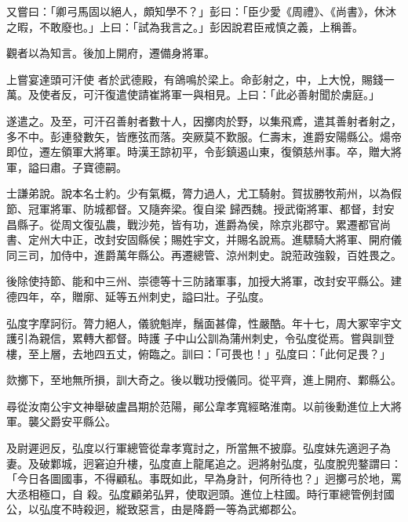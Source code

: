 \begin{pinyinscope}
 又嘗曰：「卿弓馬固以絕人，頗知學不？」彭曰：「臣少愛《周禮》、《尚書》，休沐之暇，不敢廢也。」上曰：「試為我言之。」彭因說君臣戒慎之義，上稱善。



 觀者以為知言。後加上開府，遷備身將軍。



 上嘗宴達頭可汗使
 者於武德殿，有鴿鳴於梁上。命彭射之，中，上大悅，賜錢一萬。及使者反，可汗復遣使請崔將軍一與相見。上曰：「此必善射聞於虜庭。」



 遂遣之。及至，可汗召善射者數十人，因擲肉於野，以集飛鳶，遣其善射者射之，多不中。彭連發數矢，皆應弦而落。突厥莫不歎服。仁壽末，進爵安陽縣公。煬帝即位，遷左領軍大將軍。時漢王諒初平，令彭鎮遏山東，復領慈州事。卒，贈大將軍，謚曰肅。子寶德嗣。



 士謙弟說。說本名士約。少有氣概，膂力過人，尤工騎射。賀拔勝牧荊州，以為假節、冠軍將軍、防城都督。又隨奔梁。復自梁
 歸西魏。授武衛將軍、都督，封安昌縣子。從周文復弘農，戰沙苑，皆有功，進爵為侯，除京兆郡守。累遷都官尚書、定州大中正，改封安固縣侯；賜姓宇文，并賜名說焉。進驃騎大將軍、開府儀同三司，加侍中，進爵萬年縣公。再遷總管、涼州刺史。說蒞政強毅，百姓畏之。



 後除使持節、能和中三州、崇德等十三防諸軍事，加授大將軍，改封安平縣公。建德四年，卒，贈廓、延等五州刺史，謚曰壯。子弘度。



 弘度字摩訶衍。膂力絕人，儀貌魁岸，鬚面甚偉，性嚴酷。年十七，周大冢宰宇文護引為親信，累轉大都督。時護
 子中山公訓為蒲州刺史，令弘度從焉。嘗與訓登樓，至上層，去地四五丈，俯臨之。訓曰：「可畏也！」弘度曰：「此何足畏？」



 欻擲下，至地無所損，訓大奇之。後以戰功授儀同。從平齊，進上開府、鄴縣公。



 尋從汝南公宇文神舉破盧昌期於范陽，鄖公韋孝寬經略淮南。以前後勳進位上大將軍。襲父爵安平縣公。



 及尉遲迥反，弘度以行軍總管從韋孝寬討之，所當無不披靡。弘度妹先適迥子為妻。及破鄴城，迥窘迫升樓，弘度直上龍尾追之。迥將射弘度，弘度脫兜鍪謂曰：「今日各圖國事，不得顧私。事既如此，早為身計，何所待也？」迥擲弓於地，罵大丞相極口，自
 殺。弘度顧弟弘昇，使取迥頭。進位上柱國。時行軍總管例封國公，以弘度不時殺迥，縱致惡言，由是降爵一等為武鄉郡公。




\end{pinyinscope}
